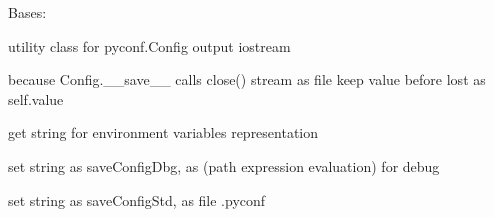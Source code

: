 \documentclass[a4paper,10pt,english]{sphinxmanual}
\begin{document}

\begin{fulllineitems}
\label{commands/apidoc/src:src.debug.OutStream}
Bases: 

utility class for pyconf.Config output iostream

\begin{fulllineitems}
\label{commands/apidoc/src:src.debug.OutStream.close}
because Config.\_\_save\_\_ calls close() stream as file
keep value before lost as self.value

\end{fulllineitems}


\end{fulllineitems}


\begin{fulllineitems}
\label{commands/apidoc/src:src.debug.getLocalEnv}
get string for environment variables representation

\end{fulllineitems}


\begin{fulllineitems}
\label{commands/apidoc/src:src.debug.getStrConfigDbg}
set string as saveConfigDbg, 
as (path expression evaluation) for debug

\end{fulllineitems}


\begin{fulllineitems}
\label{commands/apidoc/src:src.debug.getStrConfigStd}
set string as saveConfigStd, 
as file .pyconf

\end{fulllineitems}

\end{document}

